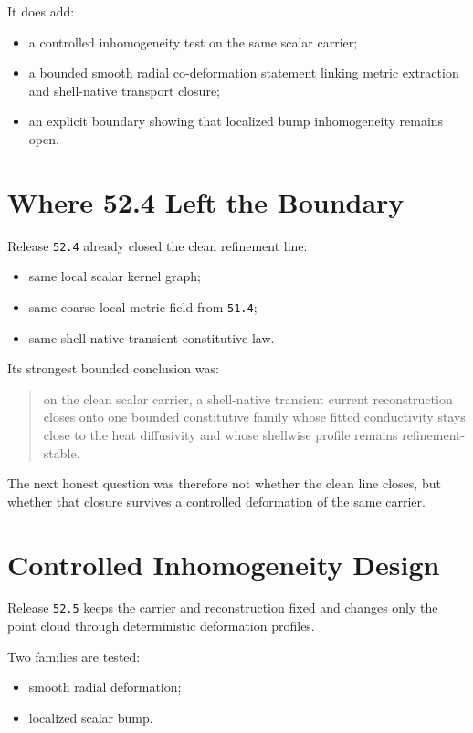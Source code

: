 \documentclass[11pt]{article}
\begin{document}
It does add:
\begin{itemize}
\item a controlled inhomogeneity test on the same scalar carrier;
\item a bounded smooth radial co-deformation statement linking metric extraction and shell-native transport closure;
\item an explicit boundary showing that localized bump inhomogeneity remains open.
\end{itemize}

\section{Where 52.4 Left the Boundary}

Release \texttt{52.4} already closed the clean refinement line:
\begin{itemize}
\item same local scalar kernel graph;
\item same coarse local metric field from \texttt{51.4};
\item same shell-native transient constitutive law.
\end{itemize}

Its strongest bounded conclusion was:

\begin{quote}
on the clean scalar carrier, a shell-native transient current reconstruction closes onto one bounded constitutive family whose fitted conductivity stays close to the heat diffusivity and whose shellwise profile remains refinement-stable.
\end{quote}

The next honest question was therefore not whether the clean line closes, but whether that closure survives a controlled deformation of the same carrier.

\section{Controlled Inhomogeneity Design}

Release \texttt{52.5} keeps the carrier and reconstruction fixed and changes only the point cloud through deterministic deformation profiles.

Two families are tested:
\begin{itemize}
\item smooth radial deformation;
\item localized scalar bump.
\end{itemize}
\end{document}
